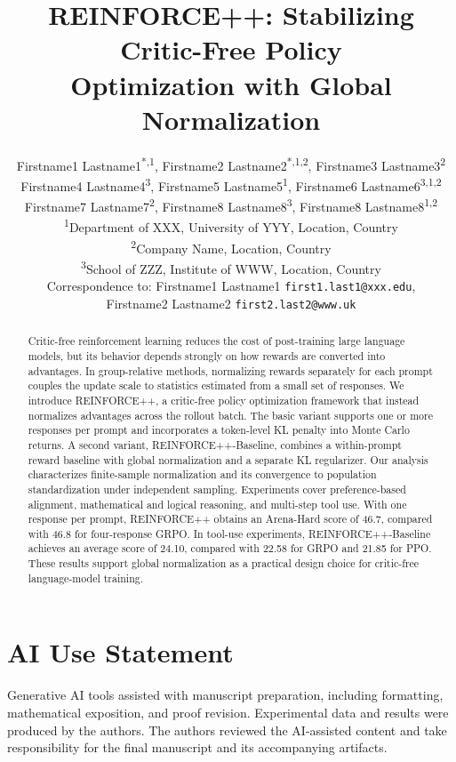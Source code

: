\documentclass{article}
\title{REINFORCE++: Stabilizing Critic-Free Policy\\Optimization with Global Normalization}
\author{%
  Firstname1 Lastname1\textsuperscript{*,1},
  Firstname2 Lastname2\textsuperscript{*,1,2},
  Firstname3 Lastname3\textsuperscript{2} \\
  Firstname4 Lastname4\textsuperscript{3},
  Firstname5 Lastname5\textsuperscript{1},
  Firstname6 Lastname6\textsuperscript{3,1,2} \\
  Firstname7 Lastname7\textsuperscript{2},
  Firstname8 Lastname8\textsuperscript{3},
  Firstname8 Lastname8\textsuperscript{1,2} \\
  \textsuperscript{1}Department of XXX, University of YYY, Location, Country \\
  \textsuperscript{2}Company Name, Location, Country \\
  \textsuperscript{3}School of ZZZ, Institute of WWW, Location, Country \\
  Correspondence to: Firstname1 Lastname1 \texttt{first1.last1@xxx.edu}, \\
  Firstname2 Lastname2 \texttt{first2.last2@www.uk}
}
\theoremstyle{plain}
\theoremstyle{definition}
\theoremstyle{remark}
\begin{document}
\maketitle

\begin{abstract}
Critic-free reinforcement learning reduces the cost of post-training large language models, but its behavior depends strongly on how rewards are converted into advantages. In group-relative methods, normalizing rewards separately for each prompt couples the update scale to statistics estimated from a small set of responses. We introduce REINFORCE++, a critic-free policy optimization framework that instead normalizes advantages across the rollout batch. The basic variant supports one or more responses per prompt and incorporates a token-level KL penalty into Monte Carlo returns. A second variant, REINFORCE++-Baseline, combines a within-prompt reward baseline with global normalization and a separate KL regularizer. Our analysis characterizes finite-sample normalization and its convergence to population standardization under independent sampling. Experiments cover preference-based alignment, mathematical and logical reasoning, and multi-step tool use. With one response per prompt, REINFORCE++ obtains an Arena-Hard score of 46.7, compared with 46.8 for four-response GRPO. In tool-use experiments, REINFORCE++-Baseline achieves an average score of 24.10, compared with 22.58 for GRPO and 21.85 for PPO. These results support global normalization as a practical design choice for critic-free language-model training.
\end{abstract}














\section*{AI Use Statement}

Generative AI tools assisted with manuscript preparation, including formatting, mathematical exposition, and proof revision. Experimental data and results were produced by the authors. The authors reviewed the AI-assisted content and take responsibility for the final manuscript and its accompanying artifacts.
\end{document}
